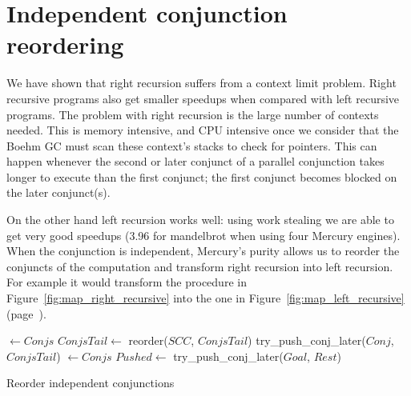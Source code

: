 
\section{Independent conjunction reordering}
\label{sec:rts_reorder}

We have shown that right recursion suffers from a context limit problem.
Right recursive programs also get smaller speedups when compared with left
recursive programs.
The problem with right recursion is the large number of contexts needed.
This is memory intensive, and CPU intensive once we consider that
the Boehm GC must scan these context's stacks to check for pointers.
This can happen whenever the second or later
conjunct of a parallel conjunction
takes longer to execute than the first conjunct;
the first conjunct becomes blocked on the later conjunct(s).

On the other hand left recursion works well:
using work stealing we are able to get very good speedups (3.96 for
mandelbrot when using four Mercury engines).
When the conjunction is independent,
Mercury's purity allows us to reorder the conjuncts of the computation and
transform right recursion into left recursion.
For example it would transform the procedure in
Figure~\ref{fig:map_right_recursive} into the one in
Figure~\ref{fig:map_left_recursive} (page~\pageref{fig:map_right_recursive}).

\begin{algorithm}
\begin{algorithmic}[1]
        \State \Return \nil
    \Else
        \State {} $\gets Conjs$
        \State $ConjsTail \gets$ reorder($SCC$, $ConjsTail$)
            \State \Return {}
        \Else
            \State \Return try\_push\_conj\_later($Conj$, $ConjsTail$)
        \EndIf
    \EndIf
\EndProcedure
{}
        \State \Return {}
    \Else
        \State {} $\gets Conjs$
            \State $Pushed \gets$ try\_push\_conj\_later($Goal$, $Rest$)
            \State \Return {}
        \Else
            \State \Return {}
        \EndIf
    \EndIf
\EndProcedure
\end{algorithmic}
\caption{Reorder independent conjunctions}
\label{alg:reorder_conjunction}
\end{algorithm}

